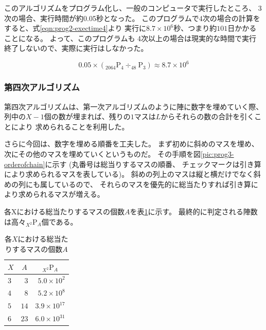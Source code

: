 このアルゴリズムをプログラム化し、一般のコンピュータで実行したところ、
3次の場合、実行時間が約0.05秒となった。
このプログラムで4次の場合の計算をすると、式\ref{eqn:prog2-exectime4}より
実行に$8.7 \times 10^6$秒、つまり約$101$日かかることになる。
よって、このプログラムも
4次以上の場合は現実的な時間で実行終了しないので、実際に実行はしなかった。

\begin{equation} \label{eqn:prog2-exectime4}
0.05 \times (_{2064} \mathrm{P} _4 \div _{48} \mathrm{P} _3) \approx 8.7 \times 10^6
\end{equation}

\subsubsection{第四次アルゴリズム}
第四次アルゴリズムは、第一次アルゴリズムのように陣に数字を埋めていく際、
列中の$X-1$個の数が埋まれば、残りの$1$マスは$L$からそれらの数の合計を引くことにより
求められることを利用した。

さらに今回は、数字を埋める順番を工夫した。
まず初めに斜めのマスを埋め、次にその他のマスを埋めていくというものだ。
その手順を図\ref{pic:prog3-orderofchain}に示す
(丸番号は総当りするマスの順番、
チェックマークは引き算により求められるマスを表している)。
斜めの列上のマスは縦と横だけでなく斜めの列にも属しているので、
それらのマスを優先的に総当たりすれば引き算により求められるマスが増える。

各Xにおける総当たりするマスの個数$A$を表\ref{tab:chaincount-each-X}に示す。
最終的に判定される陣数は高々$_{X^2} \mathrm{P} _A$個である。

\begin{table}[htb]
	\begin{center}
	\begin{tabular}{|l|r|r|}
\hline \hline
\multicolumn{1}{|c|}{$X$} & \multicolumn{1}{|c|}{$A$} & \multicolumn{1}{|c|}{$_{X^2} \mathrm{P} _A$} \\
\hline \hline
$3$ & $3$ & $5.0 \times 10^2$ \\
$4$ & $8$ & $5.2 \times 10^8$ \\
$5$ & $14$ & $3.9 \times 10^{17}$ \\
$6$ & $23$ & $6.0 \times 10^{31}$ \\
\hline
	\end{tabular}
	\end{center}
	\caption{各$X$における総当たりするマスの個数$A$}
	\label{tab:chaincount-each-X}
\end{table}

